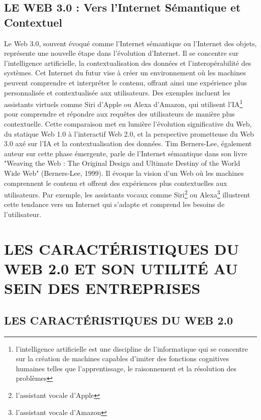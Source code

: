 \documentclass[12pt,a4paper]{article} %
\begin{document}
	\subsection{\textbf{LE WEB 3.0 : Vers l'Internet Sémantique et Contextuel}}
	Le Web 3.0, souvent évoqué comme l'Internet sémantique ou l'Internet des objets, représente une nouvelle étape dans l'évolution d'Internet. Il se concentre sur l'intelligence artificielle, la contextualisation des données et l'interopérabilité des systèmes.
	Cet Internet du futur vise à créer un environnement où les machines peuvent comprendre et interpréter le contenu, offrant ainsi une expérience plus personnalisée et contextualisée aux utilisateurs. Des exemples incluent les assistants virtuels comme Siri d'Apple ou Alexa d'Amazon, qui utilisent l'IA\footnote[3]{l'intelligence artificielle est une discipline de l'informatique qui se concentre sur la création de machines capables d'imiter des fonctions cognitives humaines telles que l'apprentissage, le raisonnement et la résolution des problèmes} pour comprendre et répondre aux requêtes des utilisateurs de manière plus contextuelle. Cette comparaison met en lumière l'évolution significative du Web, du statique Web 1.0 à l'interactif Web 2.0, et la perspective prometteuse du Web 3.0 axé sur l'IA et la contextualisation des données. 
	Tim Berners-Lee, également auteur sur cette phase émergente, parle de l'Internet sémantique dans son livre "Weaving the Web : The Original Design and Ultimate Destiny of the World Wide Web" (Berners-Lee, 1999). Il évoque la vision d'un Web où les machines comprennent le contenu et offrent des expériences plus contextuelles aux utilisateurs. Par exemple, les assistants vocaux comme Siri\footnote[4]{l'assistant vocale d'Apple} ou Alexa\footnote[5]{l'assistant vocale d'Amazon} illustrent cette tendance vers un Internet qui s'adapte et comprend les besoins de l'utilisateur.
	\section{\textbf{LES CARACTÉRISTIQUES DU WEB 2.0 ET SON UTILITÉ AU SEIN DES ENTREPRISES }}
	\subsection{\textbf{LES CARACTÉRISTIQUES DU WEB 2.0}}
	
\end{document}
